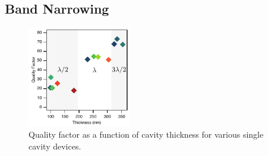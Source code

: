 \documentclass{report}
\begin{document}
        \newpage
        \subsection{Band Narrowing} \label{bandwidth}
            \begin{figure}
                \centering
                \vspace{-0.5cm}
                \includegraphics[width=0.4\textwidth]{images/n1_quality_factor.png}
                \caption{\small Quality factor as a function of cavity thickness for various single cavity devices.}
                \label{fig:bandwidth}
                \vspace{1cm}
            \end{figure}
\end{document}
